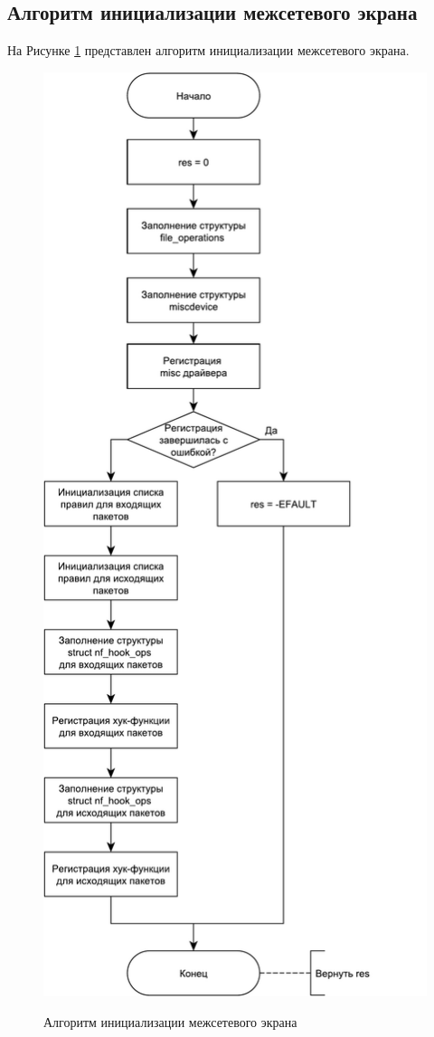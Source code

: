 \subsection{Алгоритм инициализации межсетевого экрана}
На Рисунке \ref{fig21:image} представлен алгоритм инициализации межсетевого экрана.
\begin{figure}[h!]
	\begin{center}
		{\includegraphics[scale = 0.57]{img/init.pdf}}
		\caption{Алгоритм инициализации межсетевого экрана}
		\label{fig21:image}
	\end{center}
\end{figure}

